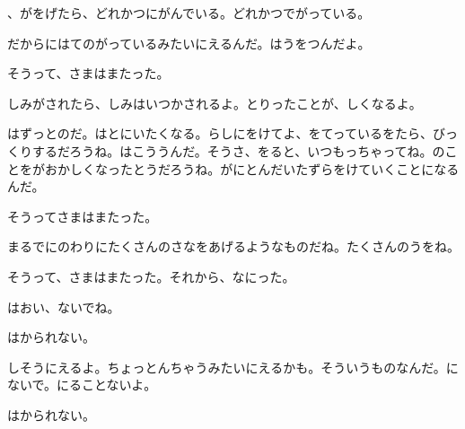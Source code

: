 、がをげたら、どれかつにがんでいる。どれかつでがっている。

だからにはてのがっているみたいにえるんだ。はうをつんだよ。

そうって、さまはまたった。

しみがされたら、しみはいつかされるよ。とりったことが、しくなるよ。

はずっとのだ。はとにいたくなる。らしにをけてよ、をてっているをたら、びっくりするだろうね。はこううんだ。そうさ、をると、いつもっちゃってね。のことをがおかしくなったとうだろうね。がにとんだいたずらをけていくことになるんだ。

そうってさまはまたった。

まるでにのわりにたくさんのさなをあげるようなものだね。たくさんのうをね。

そうって、さまはまたった。それから、なにった。

はおい、ないでね。

はかられない。

しそうにえるよ。ちょっとんちゃうみたいにえるかも。そういうものなんだ。にないで。にることないよ。

はかられない。


